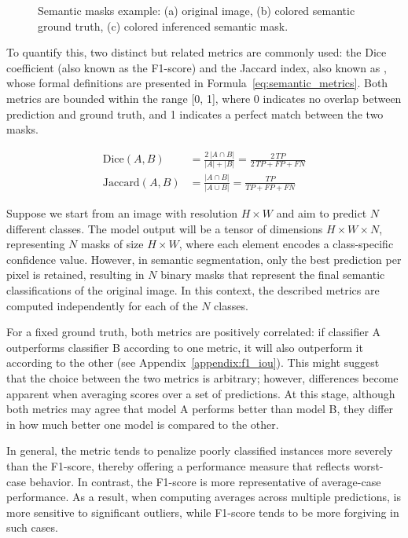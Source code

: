 \begin{figure}[htbp]
    \caption{Semantic masks example: (a) original image, (b) colored semantic ground truth, (c) colored inferenced semantic mask.}
    \label{fig:semantic_masks}
\end{figure}

To quantify this, two distinct but related metrics are commonly used: the Dice coefficient (also known as the F1-score) and the Jaccard index, also known as , whose formal definitions are presented in Formula~\ref{eq:semantic_metrics}. Both metrics are bounded within the range [0, 1], where 0 indicates no overlap between prediction and ground truth, and 1 indicates a perfect match between the two masks.

\begin{equation}
    \begin{aligned}
    \text{Dice}(A, B) &= \frac{2\,|A \cap B|}{|A| + |B|} = \frac{2\,TP}{2\,TP + FP + FN} \\
    \text{Jaccard}(A, B)  &= \frac{|A \cap B|}{|A \cup B|} = \frac{TP}{TP + FP + FN}
    \end{aligned}
    \label{eq:semantic_metrics}
\end{equation}

Suppose we start from an image with resolution $H \times W$ and aim to predict $N$ different classes. The model output will be a tensor of dimensions $H \times W \times N$, representing $N$ masks of size $H \times W$, where each element encodes a class-specific confidence value. However, in semantic segmentation, only the best prediction per pixel is retained, resulting in $N$ binary masks that represent the final semantic classifications of the original image. In this context, the described metrics are computed independently for each of the $N$ classes.

For a fixed ground truth, both metrics are positively correlated: if classifier A outperforms classifier B according to one metric, it will also outperform it according to the other (see Appendix~\ref{appendix:f1_iou}). This might suggest that the choice between the two metrics is arbitrary; however, differences become apparent when averaging scores over a set of predictions. At this stage, although both metrics may agree that model A performs better than model B, they differ in how much better one model is compared to the other.

In general, the  metric tends to penalize poorly classified instances more severely than the F1-score, thereby offering a performance measure that reflects worst-case behavior. In contrast, the F1-score is more representative of average-case performance. As a result, when computing averages across multiple predictions,  is more sensitive to significant outliers, while F1-score tends to be more forgiving in such cases.

